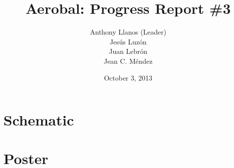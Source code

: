 \documentclass[12pt,letterpaper]{report}
\title{	
Aerobal: Progress Report \#3
}
\date{October 3, 2013}
\author{Anthony Llanos (Leader)\\ Jes\'{u}s Luz\'{o}n \\ Juan Lebr\'{o}n \\ Jean C. M\'{e}ndez}
\begin{document}
	\maketitle
	\tableofcontents
	\newpage

	
	\part*{Schematic}
	
	
	
	
	
	\part*{Poster}
	
	
\end{document}
